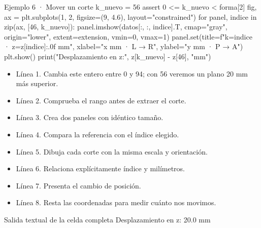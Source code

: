 \begin{Codigo}{Ejemplo 6 · Mover un corte}
k_nuevo = 56
assert 0 <= k_nuevo < forma[2]
fig, ax = plt.subplots(1, 2, figsize=(9, 4.6), layout="constrained")
for panel, indice in zip(ax, [46, k_nuevo]):
    panel.imshow(datos[:, :, indice].T, cmap="gray", origin="lower", extent=extension, vmin=0, vmax=1)
    panel.set(title=f"k={indice} · z={z[indice]:.0f} mm", xlabel="x mm · L → R", ylabel="y mm · P → A")
plt.show()
print("Desplazamiento en z:", z[k_nuevo] - z[46], "mm")
\end{Codigo}


\begin{itemize}

\item Línea 1. Cambia este entero entre 0 y 94; con 56 veremos un plano 20 mm más superior.

\item Línea 2. Comprueba el rango antes de extraer el corte.

\item Línea 3. Crea dos paneles con idéntico tamaño.

\item Línea 4. Compara la referencia con el índice elegido.

\item Línea 5. Dibuja cada corte con la misma escala y orientación.

\item Línea 6. Relaciona explícitamente índice y milímetros.

\item Línea 7. Presenta el cambio de posición.

\item Línea 8. Resta las coordenadas para medir cuánto nos movimos.

\end{itemize}

\begin{Salida}{Salida textual de la celda completa}
Desplazamiento en z: 20.0 mm
\end{Salida}



